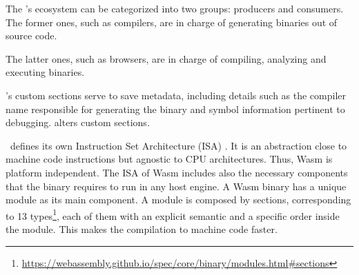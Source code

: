 
\msection{\Wasm}

\label{background:wasm:ecosystems}

The \Wasm's ecosystem can be categorized into two groups: producers and consumers.
The former ones, such as compilers, are in charge of generating \Wasm binaries out of source code.

The latter ones, such as browsers, are in charge of compiling, analyzing and executing \Wasm binaries.





\label{background:wasm:binary}

\Wasm's custom sections serve to save metadata, including details such as the compiler name responsible for generating the binary and symbol information pertinent to debugging. 
\tool alters custom sections. 


\wasm\ defines its own Instruction Set Architecture (ISA) \cite{wasm_spec}. It is an abstraction close to machine code instructions but agnostic to CPU architectures. Thus, Wasm  is platform independent. The ISA of Wasm  includes also the necessary components that the binary requires to run in any host engine. 
A Wasm  binary has a unique module as its main component. A module is composed by sections, corresponding to 13 types\footnote{\url{https://webassembly.github.io/spec/core/binary/modules.html\#sections}}, each of them with an explicit semantic and a specific order inside the module. This makes the compilation to machine code faster. %


